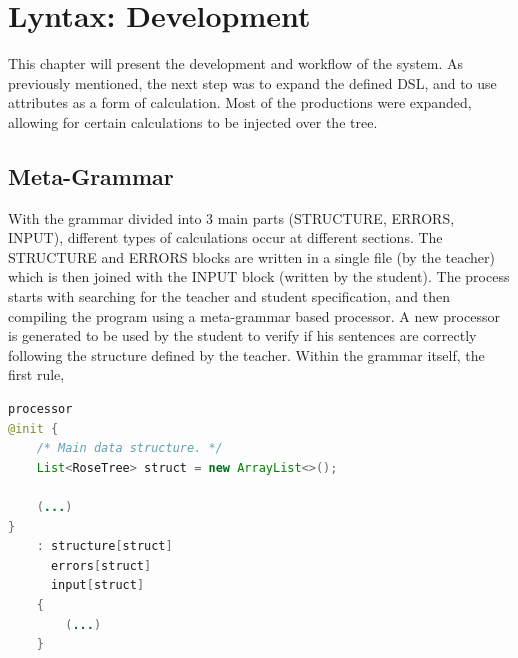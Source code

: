 \chapter{Lyntax: Development} \label{lyntax_development}

This chapter will present the development and workflow of the system. 
As previously mentioned, the next step was to expand the defined DSL, and to use attributes as a form of calculation. 
Most of the productions were expanded, allowing for certain calculations to be injected over the tree.


\section{Meta-Grammar}

With the grammar divided into 3 main parts (STRUCTURE, ERRORS, INPUT), different types of calculations occur at different sections. The STRUCTURE and ERRORS blocks are written in a single file (by the teacher) which is then joined 
with the INPUT block (written by the student). The process starts with searching for the teacher and student specification, and then compiling the program using a meta-grammar based processor. A new processor is generated to be 
used by the student to verify if his sentences are correctly following the structure defined by the teacher. Within the grammar itself, the first rule, 

%

\begin{center}
\begin{minipage}{11cm}
\begin{lstlisting}[language=java, basicstyle=\small, label={lst:processor}, caption=Processor rule from the meta-grammar]
processor
@init {
    /* Main data structure. */
    List<RoseTree> struct = new ArrayList<>();

    (...)
}
    : structure[struct]
      errors[struct]
      input[struct]
    {
        (...)
    }
\end{lstlisting}
\end{minipage}
\end{center}

